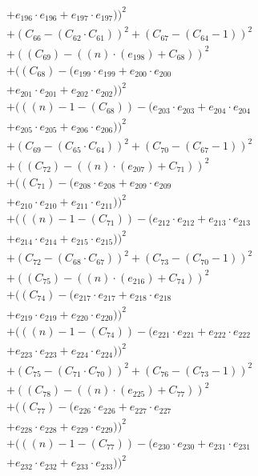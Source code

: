 \documentclass[10pt, a4paper]{article}
\begin{document}
\begin{small}
\begin{align*}
& + e_{196} \cdot e_{196} + e_{197} \cdot e_{197}))^{2} \\
& + (C_{66} - (C_{62}  \cdot  C_{61}))^{2} + (C_{67} - (C_{64} - 1))^{2} \\
& + ((C_{69}) - ((n)  \cdot  (e_{198}) + C_{68}))^{2} \\
& + ((C_{68}) - (e_{199} \cdot e_{199} + e_{200} \cdot e_{200} \\
& + e_{201} \cdot e_{201} + e_{202} \cdot e_{202}))^{2} \\
& + (((n) - 1 - (C_{68})) - (e_{203} \cdot e_{203} + e_{204} \cdot e_{204} \\
& + e_{205} \cdot e_{205} + e_{206} \cdot e_{206}))^{2} \\
& + (C_{69} - (C_{65}  \cdot  C_{64}))^{2} + (C_{70} - (C_{67} - 1))^{2} \\
& + ((C_{72}) - ((n)  \cdot  (e_{207}) + C_{71}))^{2} \\
& + ((C_{71}) - (e_{208} \cdot e_{208} + e_{209} \cdot e_{209} \\
& + e_{210} \cdot e_{210} + e_{211} \cdot e_{211}))^{2} \\
& + (((n) - 1 - (C_{71})) - (e_{212} \cdot e_{212} + e_{213} \cdot e_{213} \\
& + e_{214} \cdot e_{214} + e_{215} \cdot e_{215}))^{2} \\
& + (C_{72} - (C_{68}  \cdot  C_{67}))^{2} + (C_{73} - (C_{70} - 1))^{2} \\
& + ((C_{75}) - ((n)  \cdot  (e_{216}) + C_{74}))^{2} \\
& + ((C_{74}) - (e_{217} \cdot e_{217} + e_{218} \cdot e_{218} \\
& + e_{219} \cdot e_{219} + e_{220} \cdot e_{220}))^{2} \\
& + (((n) - 1 - (C_{74})) - (e_{221} \cdot e_{221} + e_{222} \cdot e_{222} \\
& + e_{223} \cdot e_{223} + e_{224} \cdot e_{224}))^{2} \\
& + (C_{75} - (C_{71}  \cdot  C_{70}))^{2} + (C_{76} - (C_{73} - 1))^{2} \\
& + ((C_{78}) - ((n)  \cdot  (e_{225}) + C_{77}))^{2} \\
& + ((C_{77}) - (e_{226} \cdot e_{226} + e_{227} \cdot e_{227} \\
& + e_{228} \cdot e_{228} + e_{229} \cdot e_{229}))^{2} \\
& + (((n) - 1 - (C_{77})) - (e_{230} \cdot e_{230} + e_{231} \cdot e_{231} \\
& + e_{232} \cdot e_{232} + e_{233} \cdot e_{233}))^{2} \\

\end{align*}
\end{small}
\end{document}
